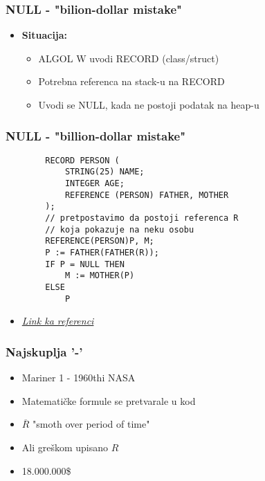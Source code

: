 \documentclass{beamer}
\begin{document}
\begin{frame}
    \frametitle{NULL - "bilion-dollar mistake"}
    \begin{itemize}
        \item \textbf{Situacija: }
        \begin{itemize}
            \item ALGOL W uvodi RECORD (class/struct) \newline
            \item Potrebna referenca na stack-u na RECORD \newline
            \item Uvodi se NULL, kada ne postoji podatak na heap-u
        \end{itemize}
    \end{itemize}
\end{frame}

\begin{frame}[fragile]
    \frametitle{NULL - "billion-dollar mistake"}
    \begin{lstlisting}
        RECORD PERSON (
            STRING(25) NAME;
            INTEGER AGE;
            REFERENCE (PERSON) FATHER, MOTHER
        );
        // pretpostavimo da postoji referenca R 
        // koja pokazuje na neku osobu
        REFERENCE(PERSON)P, M;
        P := FATHER(FATHER(R));
        IF P = NULL THEN
            M := MOTHER(P)
        ELSE
            P
    \end{lstlisting}
    \begin{itemize}
        \item \textit{\href{https://en.wikipedia.org/wiki/ALGOL_W}{Link ka referenci}}
    \end{itemize}
\end{frame}

\begin{frame}[fragile]
    \frametitle{Najskuplja '-'}
    
    \begin{itemize}
        \item Mariner 1 - 1960thi NASA \newline
        \item Matematičke formule se pretvarale u kod \newline
        \item $\overline{R}$ "smoth over period of time" \newline
        \item Ali greškom upisano $R$ \newline
        \item 18.000.000\$
    \end{itemize}
\end{frame}
\end{document}
